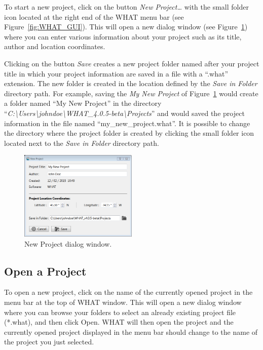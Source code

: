 \documentclass[12pt, letterpaper, fleqn]{report}
\begin{document}
To start a new project, click on the button \textsl{New Project\dots} with the small folder icon located at the right end of the WHAT menu bar (see Figure~\ref{fig:WHAT_GUI}). This will open a new dialog window (see Figure~\ref{fig:new_proj_win}) where you can enter various information about your project such as its title, author and location coordinates. 

Clicking on the button \textsl{Save} creates a new project folder named after your project title in which your project information are saved in a file with a ``.what'' extension. The new folder is created in the location defined by the \textsl{Save in Folder} directory path. For example, saving the \textsl{My New Project} of Figure~\ref{fig:new_proj_win} would create a folder named ``My New Project'' in the directory ``\textsl{C:\textbackslash{}Users\textbackslash{}johndoe\textbackslash{}WHAT\_4.0.5-beta\textbackslash{}Projects}'' and would saved the project information in the file named ``my\_new\_project.what''. It is possible to change the directory where the project folder is created by clicking the small folder icon located next to the \textsl{Save in Folder} directory path.

\begin{figure}[h!]
\centering
\includegraphics[width=0.5\textwidth]{WHAT_Screenshot_newproject}
\caption[New Project dialog window.]{New Project dialog window.}
\label{fig:new_proj_win}
\end{figure}

\FloatBarrier

\subsection{Open a Project}

To open a new project, click on the name of the currently opened project in the menu bar at the top of WHAT window. This will open a new dialog window where you can browse your folders to select an already existing project file (*.what), and then click Open. WHAT will then open the project and the currently opened project displayed in the menu bar should change to the name of the project you just selected.
\end{document}
